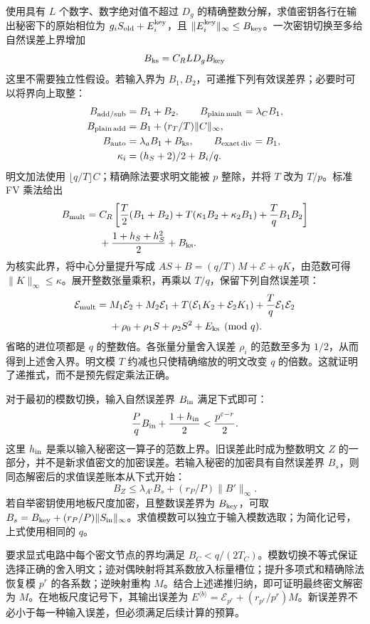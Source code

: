 使用具有 $L$ 个数字、数字绝对值不超过 $D_g$ 的精确整数分解，求值密钥各行在输出秘密下的原始相位为 $g_iS_{\rm old}+E_i^{\rm key}$，且 $\|E_i^{\rm key}\|_\infty\leq B_{\rm key}$。一次密钥切换至多给自然误差上界增加
\[
B_{\rm ks}=C_RLD_gB_{\rm key}
\]
这里不需要独立性假设。若输入界为 $B_1,B_2$，可递推下列有效误差界；必要时可以将界向上取整：
\[
\begin{aligned}
B_{\rm add/sub}&=B_1+B_2,\qquad B_{\rm plain\,mult}=\lambda_CB_1,\\
B_{\rm plain\,add}&=B_1+(r_T/T)\|C\|_\infty,\\
B_{\rm auto}&=\lambda_aB_1+B_{\rm ks},\qquad B_{\rm exact\,div}=B_1,\\
\kappa_i&=(h_S+2)/2+B_i/q.
\end{aligned}
\]
明文加法使用 $\lfloor q/T\rfloor C$；精确除法要求明文能被 $p$ 整除，并将 $T$ 改为 $T/p$。标准 FV 乘法给出
\[
\begin{aligned}
B_{\rm mult}={}&C_R\left[\frac T2(B_1+B_2)
+T(\kappa_1B_2+\kappa_2B_1)+\frac TqB_1B_2\right]\\
&+\frac{1+h_S+h_S^2}{2}+B_{\rm ks}.
\end{aligned}
\]
为核实此界，将中心分量提升写成 $AS+B=(q/T)M+\mathcal E+qK$，由范数可得 $\|K\|_\infty\leq\kappa$。展开整数张量乘积，再乘以 $T/q$，保留下列自然误差项：
\[
\begin{aligned}
\mathcal E_{\rm mult}={}&M_1\mathcal E_2+M_2\mathcal E_1
+T(\mathcal E_1K_2+\mathcal E_2K_1)+\frac Tq\mathcal E_1\mathcal E_2\\
&+\rho_0+\rho_1S+\rho_2S^2+E_{\rm ks}\pmod q.
\end{aligned}
\]
省略的进位项都是 $q$ 的整数倍。各张量分量舍入误差 $\rho_i$ 的范数至多为 $1/2$，从而得到上述舍入界。明文模 $T$ 约减也只使精确缩放的明文改变 $q$ 的倍数。这就证明了递推式，而不是预先假定乘法正确。

对于最初的模数切换，输入自然误差界 $B_{\rm in}$ 满足下式即可：
\[
\frac PqB_{\rm in}+\frac{1+h_{\rm in}}2
<\frac{p^{\varepsilon-r}}2.
\]
这里 $h_{\rm in}$ 是乘以输入秘密这一算子的范数上界。旧误差此时成为整数明文 $Z$ 的一部分，并不是新求值密文的加密误差。若输入秘密的加密具有自然误差界 $B_s$，则同态解密后的求值误差账本从下式开始：
\[
B_Z\leq\lambda_{A'}B_s+(r_P/P)\|B'\|_\infty.
\]
若自举密钥使用地板尺度加密，且整数误差界为 $B_{\rm key}$，可取 $B_s=B_{\rm key}+(r_P/P)\|S_{\rm in}\|_\infty$。求值模数可以独立于输入模数选取；为简化记号，上式使用相同的 $q$。

要求显式电路中每个密文节点的界均满足 $B_C<q/(2T_C)$。模数切换不等式保证选择正确的舍入明文；迹对偶映射将其系数放入标量槽位；提升多项式和精确除法恢复模 $p^r$ 的各系数；逆映射重构 $M$。结合上述递推归纳，即可证明最终密文解密为 $M$。在地板尺度记号下，其输出误差为 $E^{\langle b\rangle}=\mathcal E_{p^r}+(r_{p^r}/p^r)M$。新误差界不必小于每一种输入误差，但必须满足后续计算的预算。

